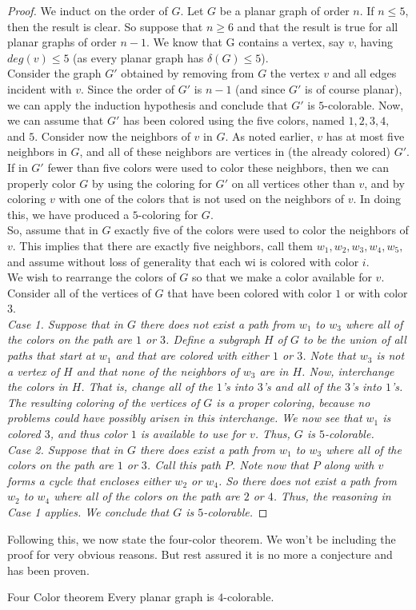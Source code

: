 \documentclass[../basic_graph_theory.tex]{subfiles}
\begin{document}
\begin{proof}
    We induct on the order of $G$. Let $G$ be a planar graph of order $n$. If $n \le 5$, then the result is clear. So suppose that $n \ge 6$ and that the result is true for all planar graphs of order $n - 1$. We know that G contains a vertex, say $v$, having $deg(v) \le 5$ (as every planar graph has $\delta(G) \le 5$).\\
    Consider the graph $G'$ obtained by removing from $G$ the vertex $v$ and all edges incident with $v$. Since the order of $G'$ is $n - 1$ (and since $G'$ is of course planar), we can apply the induction hypothesis and conclude that $G'$ is $5$-colorable. Now, we can assume that $G'$ has been colored using the five colors, named $1,2,3,4,$ and $5$. Consider now the neighbors of $v$ in $G$. As noted earlier, $v$ has at most five neighbors in $G$, and all of these neighbors are vertices in (the already colored) $G'$.\\
    If in $G'$ fewer than five colors were used to color these neighbors, then we can properly color $G$ by using the coloring for $G'$ on all vertices other than $v$, and by coloring $v$ with one of the colors that is not used on the neighbors of $v$. In doing this, we have produced a $5$-coloring for $G$.\\
    So, assume that in $G$ exactly five of the colors were used to color the neighbors of $v$. This implies that there are exactly five neighbors, call them $w_1, w_2, w_3, w_4, w_5,$ and assume without loss of generality that each wi is colored with color $i$.\\
    We wish to rearrange the colors of $G$ so that we make a color available for $v$. Consider all of the vertices of $G$ that have been colored with color $1$ or with color $3$.\\
    \em{Case 1.} Suppose that in $G$ there does not exist a path from $w_1$ to $w_3$ where all of the colors on the path are $1$ or $3$. Define a subgraph $H$ of $G$ to be the union of all paths that start at $w_1$ and that are colored with either $1$ or $3$. Note that $w_3$ is not a vertex of $H$ and that none of the neighbors of $w_3$ are in $H$. Now, interchange the colors in $H$. That is, change all of the $1$'s into $3$'s and all of the $3$'s into $1$'s. The resulting coloring of the vertices of $G$ is a proper coloring, because no problems could have possibly arisen in this interchange. We now see that $w_1$ is colored $3$, and thus color $1$ is available to use for $v$. Thus, $G$ is $5$-colorable.\\
    \em{Case 2.} Suppose that in $G$ there does exist a path from $w_1$ to $w_3$ where all of the colors on the path are $1$ or $3$. Call this path $P$. Note now that $P$ along with $v$ forms a cycle that encloses either $w_2$ or $w_4$. So there does not exist a path from $w_2$ to $w_4$ where all of the colors on the path are $2$ or $4$. Thus, the reasoning in \em{Case 1} applies. We conclude that $G$ is $5$-colorable.
\end{proof}

Following this, we now state the four-color theorem. We won't be including the proof for very obvious reasons. But rest assured it is no more a conjecture and has been proven.
\begin{Thm}{Four Color theorem}{}
    Every planar graph is $4$-colorable.
\end{Thm}{}{}
\end{document}
